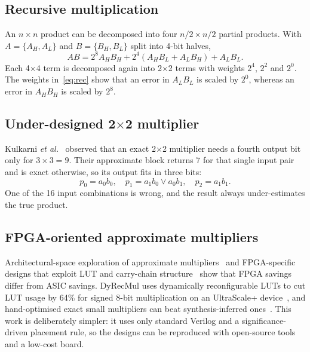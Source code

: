\documentclass[conference]{IEEEtran}
\begin{document}
\subsection{Recursive multiplication}
An $n\times n$ product can be decomposed into four $n/2\times n/2$ partial products. With $A=\{A_H,A_L\}$ and $B=\{B_H,B_L\}$ split into 4-bit halves,
\begin{equation}
AB = 2^{8}A_HB_H + 2^{4}(A_HB_L + A_LB_H) + A_LB_L .
\label{eq:rec}
\end{equation}
Each 4$\times$4 term is decomposed again into 2$\times$2 terms with weights $2^4$, $2^2$ and $2^0$. The weights in~\eqref{eq:rec} show that an error in $A_LB_L$ is scaled by $2^0$, whereas an error in $A_HB_H$ is scaled by $2^8$.

\subsection{Under-designed 2$\times$2 multiplier}
Kulkarni \emph{et al.}~\cite{kulkarni2011udm} observed that an exact 2$\times$2 multiplier needs a fourth output bit only for $3\times3=9$. Their approximate block returns $7$ for that single input pair and is exact otherwise, so its output fits in three bits:
\begin{equation}
p_0 = a_0b_0,\quad p_1 = a_1b_0 \lor a_0b_1,\quad p_2 = a_1b_1 .
\end{equation}
One of the 16 input combinations is wrong, and the result always under-estimates the true product.

\subsection{FPGA-oriented approximate multipliers}
Architectural-space exploration of approximate multipliers~\cite{rehman2016space} and FPGA-specific designs that exploit LUT and carry-chain structure~\cite{ullah2022fpga} show that FPGA savings differ from ASIC savings. DyRecMul uses dynamically reconfigurable LUTs to cut LUT usage by 64\% for signed 8-bit multiplication on an UltraScale+ device~\cite{vakili2024dyrecmul}, and hand-optimised exact small multipliers can beat synthesis-inferred ones~\cite{kida2025fourbit}. This work is deliberately simpler: it uses only standard Verilog and a significance-driven placement rule, so the designs can be reproduced with open-source tools and a low-cost board.

\end{document}
